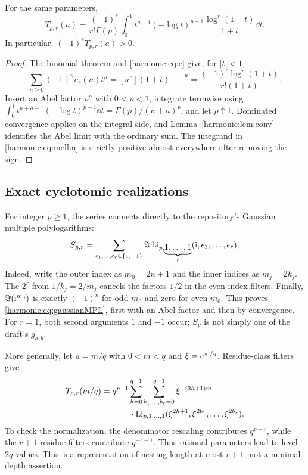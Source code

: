 \begin{proposition}\label{harmonic:prop:integral}
For the same parameters,
\begin{equation}\label{harmonic:eq:mellin}
 T_{p,r}(a)=\frac{(-1)^r}{r!\Gamma(p)}
 \int_0^1 t^{a-1}(-\log t)^{p-1}
             \frac{\log^r(1+t)}{1+t}\dd t.
\end{equation}
In particular, $(-1)^r T_{p,r}(a)>0$.
\end{proposition}
\begin{proof}
The binomial theorem and \eqref{harmonic:eq:e} give, for $|t|<1$,
\begin{equation}\label{harmonic:eq:hgen}
 \sum_{n\ge0}(-1)^ne_r(n)t^n
  =[u^r](1+t)^{-1-u}
  =\frac{(-1)^r\log^r(1+t)}{r!(1+t)}.
\end{equation}
Insert an Abel factor $\rho^n$ with $0<\rho<1$, integrate termwise using
$\int_0^1 t^{n+a-1}(-\log t)^{p-1}\dd t=\Gamma(p)/(n+a)^p$, and let $\rho\uparrow1$. Dominated convergence applies on the integral side, and Lemma~\ref{harmonic:lem:conv} identifies the Abel limit with the ordinary sum. The integrand in \eqref{harmonic:eq:mellin} is strictly positive almost everywhere after removing the sign.
\end{proof}

\subsection{Exact cyclotomic realizations}
For integer $p\ge1$, the series connects directly to the repository's Gaussian multiple polylogarithms:
\begin{equation}\label{harmonic:eq:gaussianMPL}
 S_{p,r}=\sum_{\epsilon_1,\ldots,\epsilon_r\in\{1,-1\}}
 \Im\operatorname{Li}_{p,\underbrace{1,\ldots,1}_{r}}
               (\mathrm{i},\epsilon_1,\ldots,\epsilon_r).
\end{equation}
Indeed, write the outer index as $m_0=2n+1$ and the inner indices as $m_j=2k_j$. The $2^r$ from $1/k_j=2/m_j$ cancels the factors $1/2$ in the even-index filters. Finally,
$\Im(\mathrm{i}^{m_0})$ is exactly $(-1)^n$ for odd $m_0$ and zero for even $m_0$. This proves \eqref{harmonic:eq:gaussianMPL}, first with an Abel factor and then by convergence. For $r=1$, both second arguments $1$ and $-1$ occur; $S_p$ is not simply one of the draft's $g_{a,b}$.

More generally, let $a=m/q$ with $0<m<q$ and $\xi=e^{\pi\mathrm{i}/q}$. Residue-class filters give
\begin{align}\label{harmonic:eq:rationalMPL}
 T_{p,r}(m/q)
 &=q^{p-1}\sum_{h=0}^{q-1}\sum_{b_1,\ldots,b_r=0}^{q-1}
   \xi^{-(2h+1)m} \\
 &\hspace{12mm}\cdot\Li_{p,1,\ldots,1}
 (\xi^{2h+1},\xi^{2b_1},\ldots,\xi^{2b_r}).\notag
\end{align}
To check the normalization, the denominator rescaling contributes $q^{p+r}$, while the $r+1$ residue filters contribute $q^{-r-1}$. Thus rational parameters lead to level $2q$ values. This is a representation of nesting length at most $r+1$, not a minimal-depth assertion.


